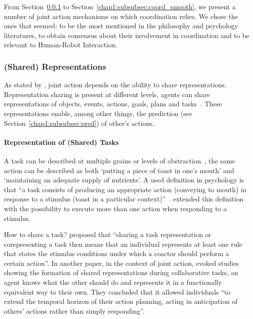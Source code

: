 \documentclass[a4paper,11pt,twoside]{StyleThese}
\begin{document}
From Section~\ref{chap1:subsubsec:shared_rep} to Section~\ref{chap1:subsubsec:coord_smooth}, we present a number of joint action mechanisms on which coordination relies. We chose the ones that seemed: to be the most mentioned in the philosophy and psychology literatures, to obtain consensus about their involvement in coordination and to be relevant to Human-Robot Interaction. 

\subsubsection{(Shared) Representations}\label{chap1:subsubsec:shared_rep}
As stated by \cite{sebanz_2006_joint}, joint action depends on the ability to share representations. Representation sharing is present at different levels, \ie agents can share representations of objects, events, actions, goals, plans and tasks~\citep{pacherie_2012_agency,vesper_2017_joint}. These representations enable, among other things, the prediction (see Section~\ref{chap1:subsubsec:pred}) of other's actions. 

\paragraph{Representation of (Shared) Tasks}
A task can be described at multiple grains or levels of abstraction~\citep{cooper_2000_contention},  the same action can be described as both ‘putting a piece of toast in one’s mouth’ and ‘maintaining an adequate supply of nutrients’. A used definition in psychology is that ``a task consists of producing an appropriate action (\eg conveying to mouth) in response to a stimulus (\eg toast in a particular context)''~\citep[p.~1]{monsell_2003_task}. \cite{sebanz_2005_two} extended this definition with the possibility to execute more than one action when responding to a stimulus. 

How to share a task? \citet[p.~1235]{sebanz_2005_two} proposed that ``sharing a task representation or corepresenting a task then means that an individual represents at least one rule that states the stimulus conditions under which a coactor should perform a certain action''.
In another paper, in the context of joint action, \citet[p.~73]{sebanz_2006_joint} evoked studies showing the formation of shared representations during collaborative tasks, \ie an agent knows what the other should do and represents it in a functionally equivalent way to their own. They concluded that it allowed individuals ``to extend the temporal horizon of their action planning,
acting in anticipation of others’ actions rather than simply responding''.
\end{document}
